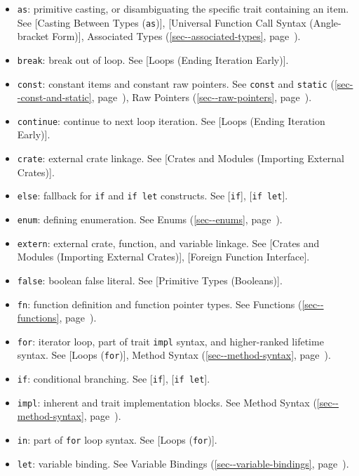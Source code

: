 \documentclass[a4paper,]{book}
\renewcommand*{\hyperref}[2][\ar]{%
  \def\ar{#2}%
  #2 (\autoref{#1}, page~\pageref{#1})}
\begin{document}
\begin{itemize}
\itemsep1pt\parskip0pt
\item
  \texttt{as}: primitive casting, or disambiguating the specific trait
  containing an item. See {[}Casting Between Types (\texttt{as}){]},
  {[}Universal Function Call Syntax (Angle-bracket Form){]},
  \hyperref[sec--associated-types]{Associated Types}.
\item
  \texttt{break}: break out of loop. See {[}Loops (Ending Iteration
  Early){]}.
\item
  \texttt{const}: constant items and constant raw pointers. See
  \hyperref[sec--const-and-static]{\texttt{const} and \texttt{static}},
  \hyperref[sec--raw-pointers]{Raw Pointers}.
\item
  \texttt{continue}: continue to next loop iteration. See {[}Loops
  (Ending Iteration Early){]}.
\item
  \texttt{crate}: external crate linkage. See {[}Crates and Modules
  (Importing External Crates){]}.
\item
  \texttt{else}: fallback for \texttt{if} and \texttt{if\ let}
  constructs. See {[}\texttt{if}{]}, {[}\texttt{if\ let}{]}.
\item
  \texttt{enum}: defining enumeration. See \hyperref[sec--enums]{Enums}.
\item
  \texttt{extern}: external crate, function, and variable linkage. See
  {[}Crates and Modules (Importing External Crates){]}, {[}Foreign
  Function Interface{]}.
\item
  \texttt{false}: boolean false literal. See {[}Primitive Types
  (Booleans){]}.
\item
  \texttt{fn}: function definition and function pointer types. See
  \hyperref[sec--functions]{Functions}.
\item
  \texttt{for}: iterator loop, part of trait \texttt{impl} syntax, and
  higher-ranked lifetime syntax. See {[}Loops (\texttt{for}){]},
  \hyperref[sec--method-syntax]{Method Syntax}.
\item
  \texttt{if}: conditional branching. See {[}\texttt{if}{]},
  {[}\texttt{if\ let}{]}.
\item
  \texttt{impl}: inherent and trait implementation blocks. See
  \hyperref[sec--method-syntax]{Method Syntax}.
\item
  \texttt{in}: part of \texttt{for} loop syntax. See {[}Loops
  (\texttt{for}){]}.
\item
  \texttt{let}: variable binding. See
  \hyperref[sec--variable-bindings]{Variable Bindings}.

\end{itemize}
\end{document}
